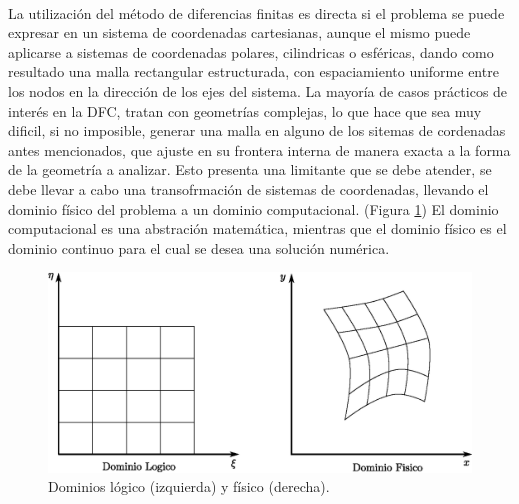 \documentclass[letterpaper, openright, 12pt]{book}
\begin{document}
	\paragraph*{}
		La utilización del método de diferencias finitas es directa si el problema se puede expresar en un sistema de coordenadas cartesianas, aunque el mismo puede aplicarse a sistemas de coordenadas polares, cilindricas o esféricas, dando como resultado una malla rectangular estructurada, con espaciamiento uniforme entre los nodos en la dirección de los ejes del sistema. La mayoría de casos prácticos de interés en la DFC, tratan con geometrías complejas, lo que hace que sea muy dificil, si no imposible, generar una malla en alguno de los sitemas de cordenadas antes mencionados, que ajuste en su frontera interna de manera exacta a la forma de la geometría a analizar. Esto presenta una limitante que se debe atender, se debe llevar a cabo una transofrmación de sistemas de coordenadas, llevando el dominio físico del problema a un dominio computacional. (Figura \ref{fig:dominios}) El dominio computacional es una abstración matemática, mientras que el dominio físico es el dominio continuo para el cual se desea una solución numérica. 
	\begin{figure}[htbp!]
		\centering
		\includegraphics[width=170mm]{./Imagenes/dominios}
		\caption[Dominios lógico y físico]{Dominios lógico (izquierda) y físico (derecha). \cite{numerical-grid}}
		\label{fig:dominios}
	\end{figure}
\end{document}
